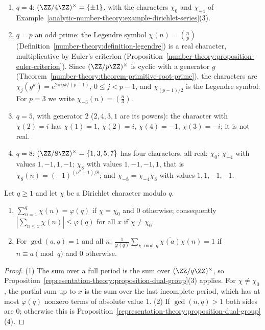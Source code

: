 \begin{example}\label{analytic-number-theory:example-dirichlet-characters}
\begin{enumerate}
\item $q = 4$: $(\ZZ/4\ZZ)^\times = \{\pm1\}$, with the characters $\chi_0$ and $\chi_{-4}$ of Example~\ref{analytic-number-theory:example-dirichlet-series}(3).
\item $q = p$ an odd prime: the Legendre symbol $\chi(n) = (\frac np)$ (Definition~\ref{number-theory:definition-legendre}) is a real character, multiplicative by Euler's criterion
(Proposition~\ref{number-theory:proposition-euler-criterion}). Since $(\ZZ/p\ZZ)^\times$ is cyclic with a generator $g$ (Theorem~\ref{number-theory:theorem-primitive-root-prime}), the characters are
$\chi_j(g^k) = e^{2\pi ijk/(p - 1)}$, $0 \leq j < p - 1$, and $\chi_{(p-1)/2}$ is the Legendre symbol. For $p = 3$ we write $\chi_{-3}(n) = (\frac n3)$.
\item $q = 5$, with generator $2$ ($2, 4, 3, 1$ are its powers): the character with $\chi(2) = i$ has $\chi(1) = 1$, $\chi(2) = i$, $\chi(4) = -1$, $\chi(3) = -i$; it is not real.
\item $q = 8$: $(\ZZ/8\ZZ)^\times = \{1, 3, 5, 7\}$ has four characters, all real: $\chi_0$; $\chi_{-4}$ with values $1, -1, 1, -1$; $\chi_8$ with values $1, -1, -1, 1$, that is
$\chi_8(n) = (-1)^{(n^2 - 1)/8}$; and $\chi_{-8} = \chi_{-4}\chi_8$ with values $1, 1, -1, -1$.
\end{enumerate}
\end{example}

\begin{proposition}\label{analytic-number-theory:proposition-dirichlet-orthogonality}
Let $q \geq 1$ and let $\chi$ be a Dirichlet character modulo $q$.
\begin{enumerate}
\item $\sum_{n=1}^q\chi(n) = \varphi(q)$ if $\chi = \chi_0$ and $0$ otherwise; consequently $|\sum_{n \leq x}\chi(n)| \leq \varphi(q)$ for all $x$ if $\chi \neq \chi_0$.
\item For $\gcd(a, q) = 1$ and all $n$: $\frac{1}{\varphi(q)}\sum_{\chi \bmod q}\overline{\chi(a)}\chi(n) = 1$ if $n \equiv a \pmod q$ and $0$ otherwise.
\end{enumerate}
\end{proposition}

\begin{proof}
(1) The sum over a full period is the sum over $(\ZZ/q\ZZ)^\times$, so Proposition~\ref{representation-theory:proposition-dual-group}(3) applies. For $\chi \neq \chi_0$, the partial sum up to $x$ is the
sum over the last incomplete period, which has at most $\varphi(q)$ nonzero terms of absolute value $1$. (2) If $\gcd(n, q) > 1$ both sides are $0$; otherwise this is
Proposition~\ref{representation-theory:proposition-dual-group}(4).
\end{proof}

